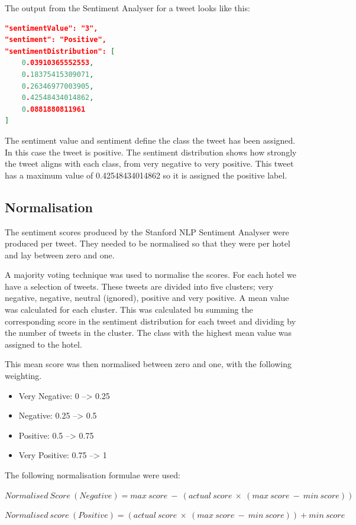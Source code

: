 The output from the Sentiment Analyser for a tweet looks like this:

\begin{lstlisting}[caption={Output from Stanford NLP Sentiment Analyser},
captionpos=b,label=lst:stanfordoutput,language=json,firstnumber=1]
"sentimentValue": "3",
"sentiment": "Positive",
"sentimentDistribution": [
    0.03910365552553,
    0.18375415309071,
    0.26346977003905,
    0.42548434014862,
    0.0881880811961
]
\end{lstlisting}

The sentiment value and sentiment define the class the tweet has been assigned. In this case the tweet is positive. The sentiment distribution shows how strongly the tweet aligns with each class, from very negative to very positive. This tweet has a maximum value of 0.42548434014862 so it is assigned the positive label.

\subsection*{Normalisation}

The sentiment scores produced by the Stanford NLP Sentiment Analyser were produced per tweet. They needed to be normalised so that they were per hotel and lay between zero and one.

A majority voting technique was used to normalise the scores. For each hotel we have a selection of tweets. These tweets are divided into five clusters; very negative, negative, neutral (ignored), positive and very positive. A mean value was calculated for each cluster. This was calculated bu summing the corresponding score in the sentiment distribution for each tweet and dividing by the number of tweets in the cluster. The class with the highest mean value was assigned to the hotel.

This mean score was then normalised between zero and one, with the following weighting.
\begin{itemize}
    \item Very Negative: 0 --> 0.25
    \item Negative: 0.25 --> 0.5
    \item Positive: 0.5 --> 0.75
    \item Very Positive: 0.75 --> 1
\end{itemize}

The following normalisation formulae were used:

\begin{tcolorbox}
\begin{center}
	$Normalised\ Score\ (Negative) = max\ score\ -\ (actual\ score\ \times\ (max\ score\ -\ min\ score))$

    $Normalised\ score\ (Positive) = (actual\ score\ \times\ (max\ score\ -\ min\ score)) + min\ score$
\end{center}
\end{tcolorbox}

